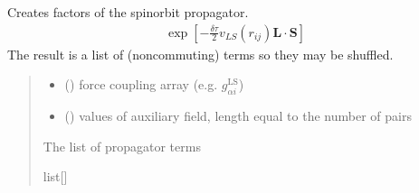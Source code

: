 \documentclass[letterpaper,10pt,english]{sphinxmanual}
\begin{document}
\begin{fulllineitems}
\begin{fulllineitems}
\label{\detokenize{spinbox:spinbox.core.HilbertPropagatorHS.factors_spinorbit}}
\pysigstartsignatures
{}
\pysigstopsignatures
\sphinxAtStartPar
Creates factors of the spin\sphinxhyphen{}orbit propagator.
\begin{equation*}
\begin{split}\exp \left[ - \frac{\delta\tau}{2} v_{LS}(r_{ij}) \mathbf{L}\cdot\mathbf{S} \right]\end{split}
\end{equation*}
\sphinxAtStartPar
The result is a list of (noncommuting) terms so they may be shuffled.
\begin{quote}\begin{description}
\begin{itemize}
\item {} 
\sphinxAtStartPar
{} ({\hyperref[\detokenize{spinbox:spinbox.core.Coupling}]{}}) \textendash{} force coupling array (e.g. \(g^\text{LS}_{\alpha i}\))

\item {} 
\sphinxAtStartPar
{} () \textendash{} values of auxiliary field, length equal to the number of pairs

\end{itemize}

\sphinxAtStartPar
The list of propagator terms

\sphinxAtStartPar
list{[}{\hyperref[\detokenize{spinbox:spinbox.core.HilbertOperator}]{}}{]}

\end{description}\end{quote}

\end{fulllineitems}


\end{fulllineitems}
\end{document}
